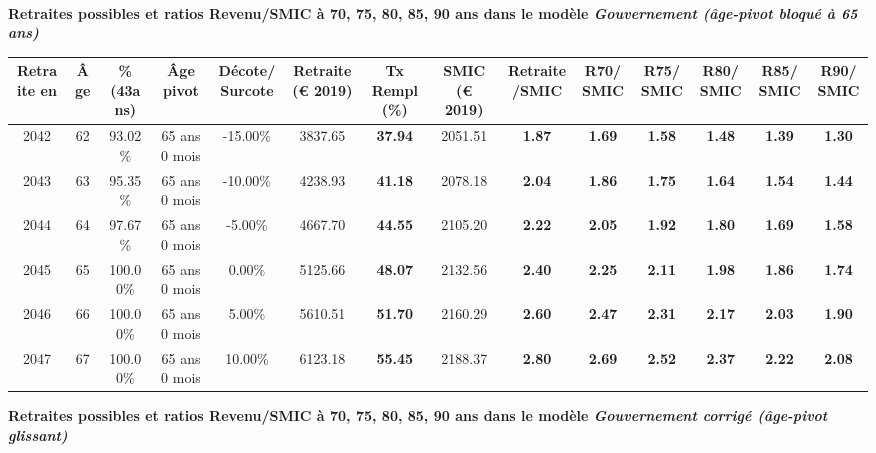  ~\\{\bf \noindent Retraites possibles et ratios Revenu/SMIC à 70, 75, 80, 85, 90 ans dans le modèle \emph{Gouvernement (âge-pivot bloqué à 65 ans)}}  
 
\begin{adjustbox}{max width=\textwidth} 
\begin{tabular}[htb]{|c|c||c|c|c||c|c||c|c||c|c|c|c|c|} 
\hline 
 Retraite en &  Âge &  \%(43ans) &  Âge pivot &  Décote/Surcote &  Retraite (\euro{} 2019) &  Tx Rempl(\%) &  SMIC (\euro{} 2019) &  Retraite/SMIC &  R70/SMIC &  R75/SMIC &  R80/SMIC &  R85/SMIC &  R90/SMIC \\ 
\hline \hline 
 2042 &  62 &  93.02\% &  65 ans 0 mois &  -15.00\% &  3837.65 &  {\bf 37.94} &  2051.51 &  {\bf 1.87} &  {\bf 1.69} &  {\bf 1.58} &  {\bf 1.48} &  {\bf 1.39} &  {\bf 1.30} \\ 
\hline 
 2043 &  63 &  95.35\% &  65 ans 0 mois &  -10.00\% &  4238.93 &  {\bf 41.18} &  2078.18 &  {\bf 2.04} &  {\bf 1.86} &  {\bf 1.75} &  {\bf 1.64} &  {\bf 1.54} &  {\bf 1.44} \\ 
\hline 
 2044 &  64 &  97.67\% &  65 ans 0 mois &  -5.00\% &  4667.70 &  {\bf 44.55} &  2105.20 &  {\bf 2.22} &  {\bf 2.05} &  {\bf 1.92} &  {\bf 1.80} &  {\bf 1.69} &  {\bf 1.58} \\ 
\hline 
 2045 &  65 &  100.00\% &  65 ans 0 mois &  0.00\% &  5125.66 &  {\bf 48.07} &  2132.56 &  {\bf 2.40} &  {\bf 2.25} &  {\bf 2.11} &  {\bf 1.98} &  {\bf 1.86} &  {\bf 1.74} \\ 
\hline 
 2046 &  66 &  100.00\% &  65 ans 0 mois &  5.00\% &  5610.51 &  {\bf 51.70} &  2160.29 &  {\bf 2.60} &  {\bf 2.47} &  {\bf 2.31} &  {\bf 2.17} &  {\bf 2.03} &  {\bf 1.90} \\ 
\hline 
 2047 &  67 &  100.00\% &  65 ans 0 mois &  10.00\% &  6123.18 &  {\bf 55.45} &  2188.37 &  {\bf 2.80} &  {\bf 2.69} &  {\bf 2.52} &  {\bf 2.37} &  {\bf 2.22} &  {\bf 2.08} \\ 
\hline 
\hline 
\end{tabular} 
\end{adjustbox} 
 
 \vspace{0.1cm} 
{\bf \noindent Retraites possibles et ratios Revenu/SMIC à 70, 75, 80, 85, 90 ans dans le modèle \emph{Gouvernement corrigé (âge-pivot glissant)}}  
 
